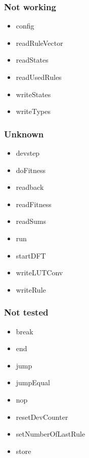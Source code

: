 \subsubsection{Not working}

\begin{itemize}
    \item config
    \item readRuleVector
    \item readStates
    \item readUsedRules
    \item writeStates
    \item writeTypes
\end{itemize}

\subsubsection{Unknown}

\begin{itemize}
    \item devstep
    \item doFitness
    \item readback
    \item readFitness
    \item readSums
    \item run
    \item startDFT
    \item writeLUTConv
    \item writeRule
\end{itemize}

\subsubsection{Not tested}

\begin{itemize}
    \item break
    \item end
    \item jump
    \item jumpEqual
    \item nop
    \item resetDevCounter
    \item setNumberOfLastRule
    \item store
\end{itemize}


